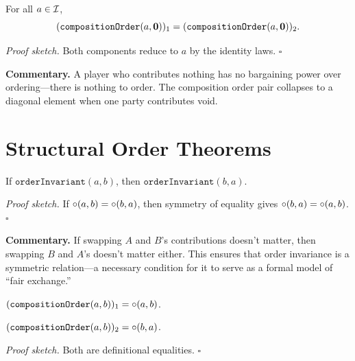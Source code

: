 \begin{theorem}
\label{thm:void_annihilates_order}
For all $a \in \mathcal{I}$,
\[
  (\texttt{compositionOrder}(a, \mathbf{0}))_1 =
  (\texttt{compositionOrder}(a, \mathbf{0}))_2.
\]
\end{theorem}

\noindent\textit{Proof sketch.}\quad
Both components reduce to $a$ by the identity laws.
\hfill$\square$

\medskip

\noindent\textbf{Commentary.}
A player who contributes nothing has no bargaining power over ordering---there
is nothing to order.  The composition order pair collapses to a diagonal
element when one party contributes void.

\section{Structural Order Theorems}
\label{sec:ch17-structural}

\begin{theorem}
\label{thm:order_invariant_symm}
If $\texttt{orderInvariant}(a, b)$, then $\texttt{orderInvariant}(b, a)$.
\end{theorem}

\noindent\textit{Proof sketch.}\quad
If $\circ(a,b) = \circ(b,a)$, then symmetry of equality gives
$\circ(b,a) = \circ(a,b)$.
\hfill$\square$

\medskip

\noindent\textbf{Commentary.}
If swapping $A$ and $B$'s contributions doesn't matter, then swapping $B$
and $A$'s doesn't matter either.  This ensures that order invariance is a
symmetric relation---a necessary condition for it to serve as a formal model
of ``fair exchange.''

\begin{theorem}
\label{thm:order_fst}
$(\texttt{compositionOrder}(a, b))_1 = \circ(a, b)$.
\end{theorem}

\begin{theorem}
\label{thm:order_snd}
$(\texttt{compositionOrder}(a, b))_2 = \circ(b, a)$.
\end{theorem}

\noindent\textit{Proof sketch.}\quad
Both are definitional equalities.
\hfill$\square$

